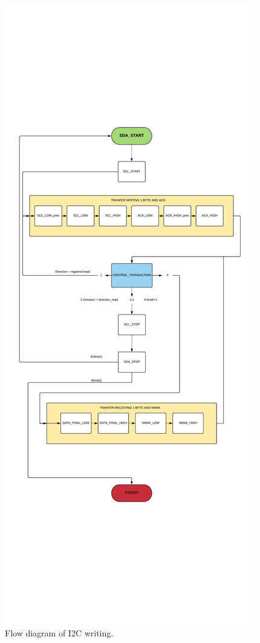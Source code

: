 \begin{figure}[H]
	\center
	\includegraphics[trim = 0mm 6cm 0mm 6cm, clip,scale=0.5]{imagenes/Cuadricoptero_vision/I2C_WRITE.pdf}
	\caption{Flow diagram of I2C writing.}
	\label{fig:i2c_write}
\end{figure}

